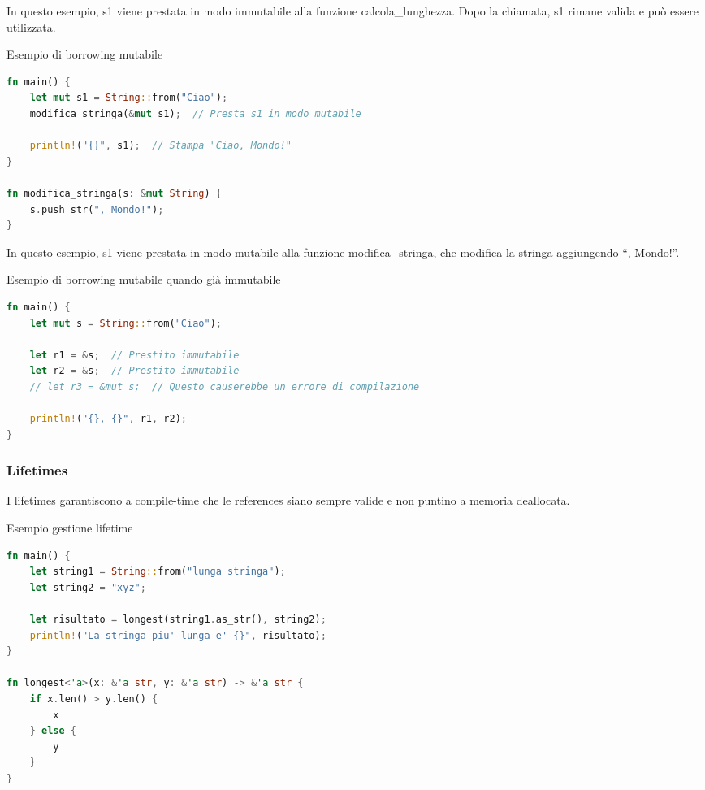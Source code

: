 In questo esempio, s1 viene prestata in modo immutabile alla funzione calcola\_lunghezza. Dopo la chiamata, s1 rimane valida e può essere utilizzata.

\begin{algorithm}[ht]
    \caption{Esempio di borrowing mutabile}
    \label{lst:borrowing_mutabile}
    \begin{lstlisting}[language=Rust, style=colouredRust]
fn main() {
    let mut s1 = String::from("Ciao");
    modifica_stringa(&mut s1);  // Presta s1 in modo mutabile
        
    println!("{}", s1);  // Stampa "Ciao, Mondo!"
}
        
fn modifica_stringa(s: &mut String) {
    s.push_str(", Mondo!");
}
\end{lstlisting}
\end{algorithm}

In questo esempio, s1 viene prestata in modo mutabile alla funzione modifica\_stringa, che modifica la stringa aggiungendo ``, Mondo!''.

\begin{algorithm}[ht]
    \caption{Esempio di borrowing mutabile quando già immutabile}
    \label{lst:borrowing_mutabile_e_immutabile}
    \begin{lstlisting}[language=Rust, style=colouredRust]
fn main() {
    let mut s = String::from("Ciao");
        
    let r1 = &s;  // Prestito immutabile
    let r2 = &s;  // Prestito immutabile
    // let r3 = &mut s;  // Questo causerebbe un errore di compilazione
        
    println!("{}, {}", r1, r2);
}
\end{lstlisting}
\end{algorithm}


\subsubsection{Lifetimes}

I lifetimes garantiscono a compile-time che le references siano sempre valide e non puntino a memoria deallocata.

\begin{algorithm}[ht]
    \caption{Esempio gestione lifetime}
    \label{lst:lifetimes}
\begin{lstlisting}[language=Rust, style=colouredRust]
fn main() {
    let string1 = String::from("lunga stringa");
    let string2 = "xyz";
    
    let risultato = longest(string1.as_str(), string2);
    println!("La stringa piu' lunga e' {}", risultato);
}
    
fn longest<'a>(x: &'a str, y: &'a str) -> &'a str {
    if x.len() > y.len() {
        x
    } else {
        y
    }
}
\end{lstlisting}
\end{algorithm}


